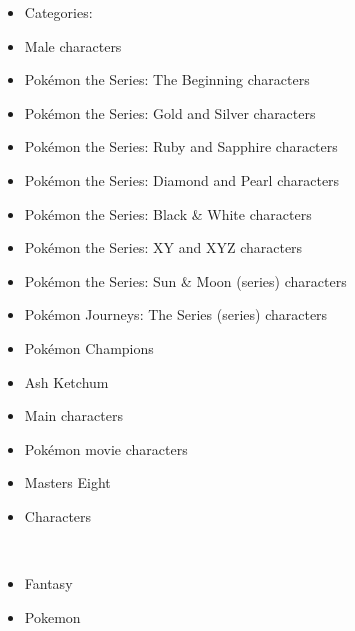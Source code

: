 \documentclass[a4paper,12pt]{article}
\begin{document}
\begin{itemize}
\item Categories:
\item Male characters
\item Pokémon the Series: The Beginning characters
\item Pokémon the Series: Gold and Silver characters
\item Pokémon the Series: Ruby and Sapphire characters
\item Pokémon the Series: Diamond and Pearl characters
\item Pokémon the Series: Black & White characters
\item Pokémon the Series: XY and XYZ characters
\item Pokémon the Series: Sun & Moon (series) characters
\item Pokémon Journeys: The Series (series) characters
\item Pokémon Champions
\item Ash Ketchum
\item Main characters
\item Pokémon movie characters
\item Masters Eight
\item Characters
\end{itemize}\\ \par \vspace{0.5cm}

\begin{itemize}
\item Fantasy
\item Pokemon
\end{itemize}\\ \par \vspace{0.5cm}
\end{document}
